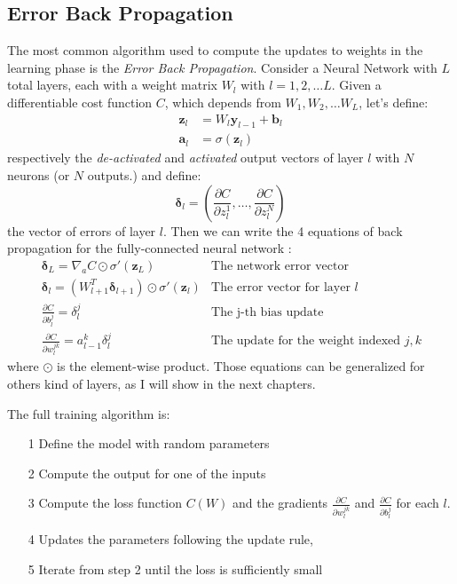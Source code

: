 \documentclass[12pt,a4paper]{report}
\begin{document}
\subsection*{Error Back Propagation}

The most common algorithm used to compute the updates to weights in the learning phase is the {\it Error Back Propagation}. 
Consider a Neural Network with $L$ total layers, each with a weight matrix $W_l$ with $l = 1, 2, \dots L$.
Given a differentiable cost function $C$, which depends from $W_1, W_2,\dots W_L$, let's define:
\begin{align}
 \bm{z}_l &= W_l \bm{y}_{l-1} + \bm{b}_l  \\ 
 \bm{a}_l &= \sigma(\bm{z}_l)
\end{align}
respectively the {\it de-activated} and {\it activated} output vectors of layer $l$ with $N$ neurons (or $N$ outputs.) and define:
\begin{equation}
 \bm{\delta}_l = (\frac{\partial C}{\partial z_l^1}, \dots , \frac{\partial C}{\partial z_l^N}) 
\end{equation}
the vector of errors of layer $l$. Then we can write the 4 equations of back propagation for the fully-connected neural network \cite{neural-net-nielsen}:
\begin{align}
  &\bm{\delta}_L = \nabla_a C \odot \sigma'(\bm{z}_L) & \mbox{The network error vector} \\ 
  &\bm{\delta}_l = (W_{l+1}^T \bm{\delta}_{l+1}) \odot \sigma'(\bm{z}_l) & \mbox{The error vector for layer $l$} \\
  &\frac{\partial C}{\partial b_l^j} = \delta_l^j & \mbox{The j-th bias update} \\
  &\frac{\partial C}{\partial w_l^{j k}} = a_{l-1}^k \delta_{l}^{j} & \mbox{The update for the weight indexed $j,k$ }
\end{align}
where  $\odot$ is the element-wise product.
Those equations can be generalized for others kind of layers, as I will show in the next chapters. 

The full training algorithm is: 
\begin{itemize}
 \setlength\itemsep{-0.3em}
 \item [1] Define the model with random parameters
 \item [2] Compute the output for one of the inputs
 \item [3] Compute the loss function $C(W)$ and the gradients $\frac{\partial C}{\partial w_l^{j k}}$ and $\frac{\partial C}{\partial b_l^j}$ for each $l$.
 \item [4] Updates the parameters following the update rule, 
 \item [5] Iterate from step 2 until the loss is sufficiently small
\end{itemize}
\end{document}
